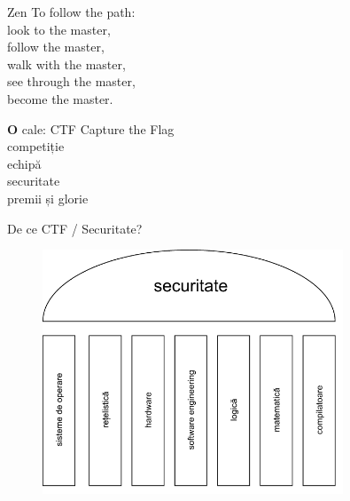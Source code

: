 \documentclass{simple}
\begin{document}
\begin{frame}{Zen}
  To follow the path: \\
  look to the master, \\
  follow the master, \\
  walk with the master, \\
  see through the master, \\
  become the master.
\end{frame}

\begin{frame}{\textbf{O} cale: CTF}
  \centering
  \pause
  \vspace{0.5cm}
  \Large{Capture the Flag} \\
  \pause
  \vspace{0.5cm}
  \Large{competiție} \\
  \pause
  \vspace{0.5cm}
  \Large{echipă} \\
  \pause
  \vspace{0.5cm}
  \Large{securitate} \\
  \pause
  \vspace{0.5cm}
  \Large{premii și glorie}
\end{frame}

\begin{frame}{De ce CTF / Securitate?}
  \begin{figure}[!htbp]
    \centering
    \includegraphics[width=0.8\textwidth]{img/security-deps.pdf}
  \end{figure}
\end{frame}
\end{document}

